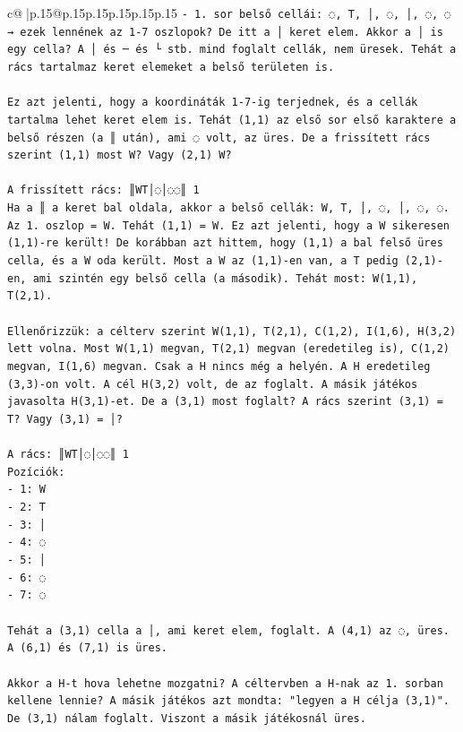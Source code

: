 \documentclass{article}
\begin{document}
{\begin{supertabular}{c@{$\;$}|p{.15\linewidth}@{}p{.15\linewidth}p{.15\linewidth}p{.15\linewidth}p{.15\linewidth}p{.15\linewidth}}
{{{\texttt{{-} 1. sor belső cellái: ◌, T, │, ◌, │, ◌, ◌ → ezek lennének az 1{-}7 oszlopok? De itt a │ keret elem. Akkor a │ is egy cella? A │ és ─ és └ stb. mind foglalt cellák, nem üresek. Tehát a rács tartalmaz keret elemeket a belső területen is.} \\
\\ 
\texttt{Ez azt jelenti, hogy a koordináták 1{-}7{-}ig terjednek, és a cellák tartalma lehet keret elem is. Tehát (1,1) az első sor első karaktere a belső részen (a ║ után), ami ◌ volt, az üres. De a frissített rács szerint (1,1) most W? Vagy (2,1) W?} \\
\\ 
\texttt{A frissített rács: ║WT│◌│◌◌║ 1} \\
\texttt{Ha a ║ a keret bal oldala, akkor a belső cellák: W, T, │, ◌, │, ◌, ◌. Az 1. oszlop = W. Tehát (1,1) = W. Ez azt jelenti, hogy a W sikeresen (1,1){-}re került! De korábban azt hittem, hogy (1,1) a bal felső üres cella, és a W oda került. Most a W az (1,1){-}en van, a T pedig (2,1){-}en, ami szintén egy belső cella (a második). Tehát most: W(1,1), T(2,1). } \\
\\ 
\texttt{Ellenőrizzük: a célterv szerint W(1,1), T(2,1), C(1,2), I(1,6), H(3,2) lett volna. Most W(1,1) megvan, T(2,1) megvan (eredetileg is), C(1,2) megvan, I(1,6) megvan. Csak a H nincs még a helyén. A H eredetileg (3,3){-}on volt. A cél H(3,2) volt, de az foglalt. A másik játékos javasolta H(3,1){-}et. De a (3,1) most foglalt? A rács szerint (3,1) = T? Vagy (3,1) = │?} \\
\\ 
\texttt{A rács: ║WT│◌│◌◌║ 1} \\
\texttt{Pozíciók:} \\
\texttt{{-} 1: W} \\
\texttt{{-} 2: T} \\
\texttt{{-} 3: │} \\
\texttt{{-} 4: ◌} \\
\texttt{{-} 5: │} \\
\texttt{{-} 6: ◌} \\
\texttt{{-} 7: ◌} \\
\\ 
\texttt{Tehát a (3,1) cella a │, ami keret elem, foglalt. A (4,1) az ◌, üres. A (6,1) és (7,1) is üres.} \\
\\ 
\texttt{Akkor a H{-}t hova lehetne mozgatni? A céltervben a H{-}nak az 1. sorban kellene lennie? A másik játékos azt mondta: "legyen a H célja (3,1)". De (3,1) nálam foglalt. Viszont a másik játékosnál üres. } \\
}}}
\end{supertabular}}
\end{document}
